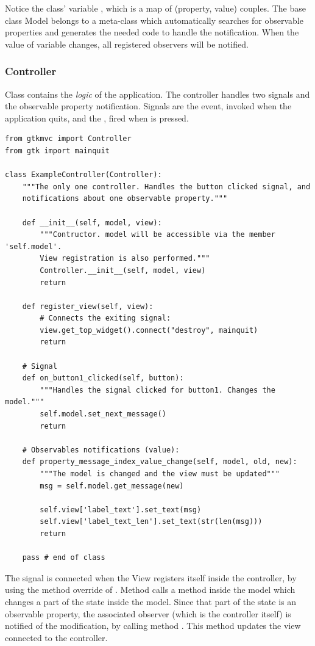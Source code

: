 Notice the class' variable , which is a
map of (property, value) couples. The base class Model belongs to a
meta-class which automatically searches for observable properties and
generates the needed code to handle the notification.  When the value
of variable  changes, all registered
observers will be notified.


\subsubsection{Controller}
Class  contains the \emph{logic} of the
application. The controller handles two signals and the observable
property notification. Signals are the  event,
invoked when the application quits, and the
, fired when  is
pressed.

{ \codesize 
\begin{verbatim} 
from gtkmvc import Controller
from gtk import mainquit

class ExampleController(Controller):
    """The only one controller. Handles the button clicked signal, and
    notifications about one observable property."""

    def __init__(self, model, view):
        """Contructor. model will be accessible via the member 'self.model'.
        View registration is also performed."""
        Controller.__init__(self, model, view)
        return

    def register_view(self, view):
        # Connects the exiting signal:
        view.get_top_widget().connect("destroy", mainquit)
        return

    # Signal
    def on_button1_clicked(self, button):
        """Handles the signal clicked for button1. Changes the model."""
        self.model.set_next_message()
        return

    # Observables notifications (value):
    def property_message_index_value_change(self, model, old, new):
        """The model is changed and the view must be updated"""
        msg = self.model.get_message(new)
        
        self.view['label_text'].set_text(msg)
        self.view['label_text_len'].set_text(str(len(msg)))
        return    

    pass # end of class
\end{verbatim}
}

The  signal is connected when the View registers
itself inside the controller, by using the method override of
.  Method 
calls a method inside the model which changes a part of the state
inside the model. Since that part of the state is an observable
property, the associated observer (which is the controller itself) is
notified of the modification, by calling method
. This method
updates the view connected to the controller.

